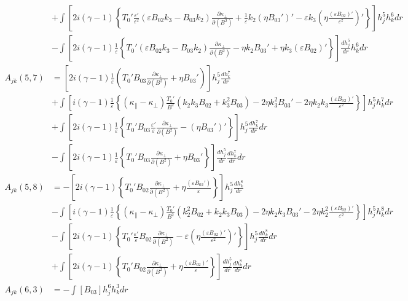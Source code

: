 \documentclass[11pt, fleqn]{article}
\newcommand{\eps}{\varepsilon}
\begin{document}
\begin{align*}
				 &+  \int\left[2i(\gamma-1)\left\{T_0'\frac{\eps'}{\eps^2}(\eps B_{02}k_3 - B_{03}k_2)\frac{\partial\kappa_\bot}{\partial(B^2)} + \frac{1}{\eps}k_2(\eta B_{03}')' 
				 										- \eps k_3\left(\eta \frac{(\eps B_{02})'}{\eps^2}\right)'\right\}\right] h_j^5 h_k^6 dr																										\\
				 &-  \int\left[2i(\gamma-1)\frac{1}{\eps}\left\{T_0'(\eps B_{02}k_3 - B_{03}k_2)\frac{\partial\kappa_\bot}{\partial(B^2)} - \eta k_2B_{03}' + \eta k_3(\eps B_{02})' \right\}\right] \frac{dh_j^5}{dr}h_k^6 dr							\\[10pt]
	A_{jk}(5, 7) &=  \left[2i(\gamma-1)\frac{1}{\eps}\left(T_0'B_{03}\frac{\partial\kappa_\bot}{\partial(B^2)} + \eta B_{03}'\right)\right] h_j^5 \frac{dh_k^7}{dr}																						\\
				 &+  \int\left[i(\gamma-1)\frac{1}{\eps}\left\{(\kappa_\parallel - \kappa_\bot)\frac{T_0'}{B^2}(k_2k_3B_{02} + k_3^2B_{03}) - 2\eta k_3^2 B_{03}' - 2\eta k_2k_3\frac{(\eps B_{02})'}{\eps^2}\right\}\right] h_j^5 h_k^7 dr				\\
				 &+  \int\left[2i(\gamma-1)\frac{1}{\eps}\left\{T_0'B_{03}\frac{\eps'}{\eps}\frac{\partial\kappa_\bot}{\partial(B^2)} - (\eta B_{03}')'\right\}\right] h_j^5 \frac{dh_k^7}{dr} dr														\\
				 &-  \int\left[2i(\gamma-1)\frac{1}{\eps}\left\{T_0'B_{03}\frac{\partial\kappa_\bot}{\partial(B^2)} + \eta B_{03}'\right\}\right] \frac{dh_j^5}{dr}\frac{dh_k^7}{dr} dr																	\\
	A_{jk}(5, 8) &=  -\left[2i(\gamma-1)\left\{T_0' B_{02}\frac{\partial\kappa_\bot}{\partial(B^2)} + \eta\frac{(\eps B_{02}')}{\eps}\right\}\right] h_j^5 \frac{dh_k^8}{dr}																			\\
				 &-  \int\left[i(\gamma-1)\frac{1}{\eps}\left\{(\kappa_\parallel - \kappa_\bot)\frac{T_0'}{B^2}(k_2^2 B_{02} + k_2k_3B_{03}) - 2\eta k_2k_3B_{03}' - 2\eta k_2^2\frac{(\eps B_{02})'}{\eps^2}\right\}\right] h_j^5 h_k^8 dr				\\
				 &-  \int\left[2i(\gamma-1)\left\{T_0'\frac{\eps'}{\eps}B_{02}\frac{\partial\kappa_\bot}{\partial(B^2)} - \eps\left(\eta\frac{(\eps B_{02})'}{\eps^2}\right)'\right\}\right]h_j^5 \frac{dh_k^8}{dr} dr									\\
				 &+  \int\left[2i(\gamma-1)\left\{T_0' B_{02}\frac{\partial\kappa_\bot}{\partial(B^2)} + \eta\frac{(\eps B_{02})'}{\eps}\right\}\right] \frac{dh_j^5}{dr}\frac{dh_k^8}{dr} dr															\\
	A_{jk}(6, 3) &= -\int \left[B_{03}\right] h_j^6 h_k^3 dr								\\

\end{align*}
\end{document}
